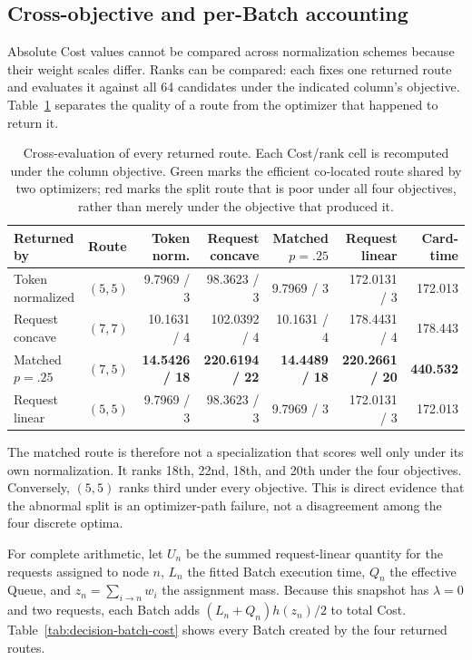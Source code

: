 \documentclass[10pt]{article}
\newcommand{\keydata}[1]{\textcolor{green!40!black}{\textbf{#1}}}
\newcommand{\alertdata}[1]{\textcolor{red!70!black}{\textbf{#1}}}
\begin{document}
\subsection{Cross-objective and per-Batch accounting}

Absolute Cost values cannot be compared across normalization schemes because
their weight scales differ. Ranks can be compared: each fixes one returned
route and evaluates it against all 64 candidates under the indicated column's
objective. Table~\ref{tab:decision-cross-cost} separates the quality of a
route from the optimizer that happened to return it.

\begin{table}[t]
\centering
\small
\caption{Cross-evaluation of every returned route. Each Cost/rank cell is
recomputed under the column objective. Green marks the efficient co-located
route shared by two optimizers; red marks the split route that is poor under
all four objectives, rather than merely under the objective that produced it.}
\label{tab:decision-cross-cost}
\begin{tabular}{llrrrrr}
\toprule
Returned by & Route & Token norm. & Request concave & Matched $p=.25$ & Request linear & Card-time \\
\midrule
Token normalized & \keydata{$(5,5)$} & 9.7969 / 3 & 98.3623 / 3 & 9.7969 / 3 & 172.0131 / 3 & 172.013 \\
Request concave & $(7,7)$ & 10.1631 / 4 & 102.0392 / 4 & 10.1631 / 4 & 178.4431 / 4 & 178.443 \\
Matched $p=.25$ & \alertdata{$(7,5)$} & \alertdata{14.5426 / 18} & \alertdata{220.6194 / 22} & \alertdata{14.4489 / 18} & \alertdata{220.2661 / 20} & \alertdata{440.532} \\
Request linear & \keydata{$(5,5)$} & 9.7969 / 3 & 98.3623 / 3 & 9.7969 / 3 & 172.0131 / 3 & 172.013 \\
\bottomrule
\end{tabular}
\end{table}

The matched route is therefore not a specialization that scores well only
under its own normalization. It ranks 18th, 22nd, 18th, and 20th under the
four objectives. Conversely, $(5,5)$ ranks third under every objective. This
is direct evidence that the abnormal split is an optimizer-path failure, not
a disagreement among the four discrete optima.

For complete arithmetic, let $U_n$ be the summed request-linear quantity for
the requests assigned to node $n$, $L_n$ the fitted Batch execution time,
$Q_n$ the effective Queue, and $z_n=\sum_{i\rightarrow n}w_i$ the assignment
mass. Because this snapshot has $\lambda=0$ and two requests, each Batch adds
$(L_n+Q_n)h(z_n)/2$ to total Cost. Table~\ref{tab:decision-batch-cost}
shows every Batch created by the four returned routes.
\end{document}
